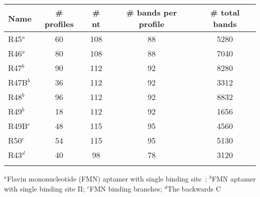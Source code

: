 \begin{table}
{\begin{tabular}{lcccc}
\toprule
Name& \# profiles & \# nt & \# bands per profile & \# total bands \\
\midrule
R45$^a$  &60&	108&	88&	5280\\
R46$^a$  &80&	108&	88&	7040\\
R47$^b$  &90&	112&	92&	8280\\
R47B$^b$  &36&	112&	92&	3312\\
R48$^b$  &96&	112&	92&	8832\\
R49$^b$  &18&	112&	92&	1656\\
R49B$^c$  &48&	115&	95&	4560\\
R50$^c$  &54&	115&	95&	5130\\
R43$^d$  &40&	98&	78&	3120\\
\botrule
\end{tabular}}
{$^a$Flavin mononucleotide (FMN) aptamer with single binding site~\citep{lee2012eterna}; $^b$FMN aptamer with single binding site II; $^c$FMN binding branches; $^d$The backwards C%
}
\end{table}



